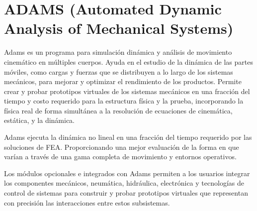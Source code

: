     \newpage

\section{ADAMS (Automated Dynamic Analysis of Mechanical Systems)}


    Adams es un programa para simulación dinámica y análisis de movimiento cinemático en múltiples cuerpos. Ayuda en el estudio de la dinámica de las partes móviles, como cargas y fuerzas que se distribuyen a lo largo de los sistemas mecánicos, para mejorar y optimizar el rendimiento de los productos. Permite  crear y probar prototipos virtuales de los sistemas mecánicos en una fracción del tiempo y costo requerido para la estructura física y la prueba, incorporando la física real de forma simultánea a la resolución de ecuaciones de cinemática, estática, y la dinámica.

    Adams ejecuta la dinámica no lineal en una fracción del tiempo requerido por las soluciones de FEA. Proporcionando una mejor evaluación de la forma en que varían a través de una gama completa de movimiento y entornos operativos.
    
    Los módulos opcionales e integrados con Adams permiten a los usuarios integrar los componentes mecánicos, neumática, hidráulica, electrónica y tecnologías de control de sistemas para construir y probar prototipos virtuales que representan con precisión las interacciones entre estos subsistemas.


